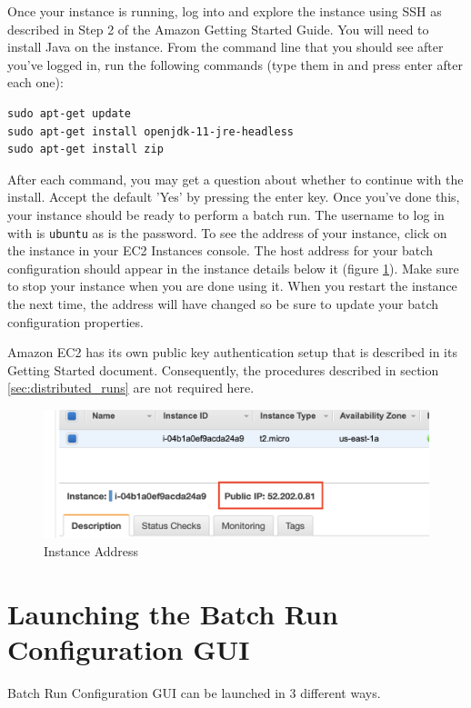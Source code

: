 \documentclass[11pt]{amsart}
\begin{document}
Once your instance is running, log into and explore the instance using SSH as described in Step 2 of the Amazon Getting Started Guide. You will need to install Java on the instance. From the command line that you should see after you've logged in, run the following commands (type them in and press enter after each one):

\begin{Verbatim}
sudo apt-get update
sudo apt-get install openjdk-11-jre-headless
sudo apt-get install zip
\end{Verbatim}

After each command, you may get a question about whether to continue with the install. Accept the default 'Yes' by pressing the enter key. Once you've done this, your instance should be ready to perform a batch run. The username to log in with is {\tt ubuntu} as is the password. To see the address of your instance, click on the instance in your EC2 Instances console. The host address for your batch configuration should appear in the instance details below it (figure \ref{fig:instance_addr}). Make sure to stop your instance when you are done using it. When you restart the instance the next time, the address will have changed so be sure to update your batch configuration properties.

Amazon EC2 has its own public key authentication setup that is described in its Getting Started document. Consequently, the procedures described in section \ref{sec:distributed_runs} are not required here.

 \begin{figure}[h]
\begin{center}
\vspace{.2in}
\centerline {
\includegraphics[width=6in]{images/instance_addr.png}
}
\caption{Instance Address}
\label{fig:instance_addr}
\end{center}
\end{figure}

\label{sec:gui_launch}
\section{Launching the Batch Run Configuration GUI}
Batch Run Configuration GUI can be launched in 3 different ways.
\end{document}

